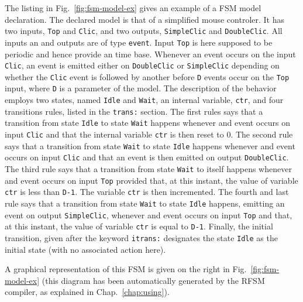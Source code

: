 \medskip The listing in Fig.~\ref{fig:fsm-model-ex} gives an example of a FSM model declaration. The
declared model is that of a simplified mouse controler. It has two inputs, \verb|Top| and
\verb|Clic|, and two outputs, \verb|SimpleClic| and \verb|DoubleClic|. All inputs an and outputs are
of type \verb|event|. Input \verb|Top| is here supposed to be periodic and hence provide an time
base. Whenever an event occurs on the input \verb|Clic|, an event is emitted either on
\verb|DoubleClic| or \verb|SimpleClic| depending on whether the \verb|Clic| event is followed by
another before \verb|D| events occur on the \verb|Top| input, where \verb|D| is a parameter of the
model. The description of the behavior employs two states, named \verb|Idle| and \verb|Wait|, an
internal variable, \verb|ctr|, and four transitions rules, listed in the \verb|trans:| section.  The
first rules says that a transition from state \verb|Idle| to state \verb|Wait| happens whenever and
event occurs on input \verb|Clic| and that the internal variable \verb|ctr| is then reset to 0. The
second rule says that a transition from state \verb|Wait| to state \verb|Idle| happens whenever and
event occurs on input \verb|Clic| and that an event is then emitted on output \verb|DoubleClic|. The
third rule says that a transition from state \verb|Wait| to itself happens whenever and event occurs
on input \verb|Top| provided that, at this instant, the value of variable \verb|ctr| is less than
\verb|D-1|. The variable \verb|ctr| is then incremented. The fourth and last rule says that a
transition from state \verb|Wait| to state \verb|Idle| happens, emitting an event on output
\verb|SimpleClic|, whenever and event occurs on input \verb|Top| and that, at this instant, the
value of variable \verb|ctr| is equal to \verb|D-1|. Finally, the initial transition, given after
the keyword \verb|itrans:| designates the state \verb|Idle| as the initial state (with no associated
action here). 

A graphical representation of this FSM is given on the right in Fig.~\ref{fig:fsm-model-ex} (this
diagram has been automatically generated by the RFSM compiler, as explained in
Chap.~\ref{chap:using}). 

